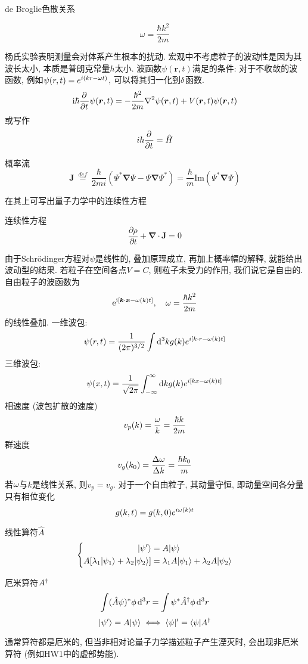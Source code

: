 \documentclass[UTF8]{ctexart}
\numberwithin{equation}{subsection}
\newcommand{\nts}[1]{
    \begin{center}
        \begin{notices}{}{}
            #1
        \end{notices}
    \end{center}
}
\begin{document}
de Broglie色散关系
\nts{
$$\omega ={\frac{\hbar k^{2}}{2m}}$$
}
杨氏实验表明测量会对体系产生根本的扰动. 
宏观中不考虑粒子的波动性是因为其波长太小, 本质是普朗克常量$h$太小. 
波函数$\psi(\bm{r},t)$满足的条件:
对于不收敛的波函数, 例如$\psi(r,t)=e^{i(kr-\omega t)}$, 可以将其归一化到$\delta$函数.
$$\mathrm{i}\hbar\frac{\partial^{} }{\partial t^{}}\psi(\bm{r},t)=-\frac{\hbar^2}{2m}\nabla^2\psi(\bm{r},t)+V(\bm{r},t)\psi(\bm{r},t)$$
或写作
$$i\hbar\frac{\partial^{} }{\partial t^{}}=\hat H$$
\begin{defi}{概率流}{}
$${\mathbf  {J}}\ {\stackrel  {def}{=}}\ {\frac  {\hbar }{2mi}}\left(\Psi ^{*}{\boldsymbol  {\nabla }}\Psi -\Psi {\boldsymbol  {\nabla }}\Psi ^{*}\right)={\frac  \hbar m}{\mbox{Im}}(\Psi ^{*}{\boldsymbol  {\nabla }}\Psi )$$
\end{defi}
在其上可写出量子力学中的连续性方程
\begin{thm}{连续性方程}{}
$${\frac  {\partial \rho }{\partial t}}+{\boldsymbol  {\nabla }}\cdot {\mathbf  {J}}=0$$
\end{thm}
由于Schrödinger方程对$\psi$是线性的, 叠加原理成立, 再加上概率幅的解释, 就能给出波动型的结果. 
若粒子在空间各点$V=C$, 则粒子未受力的作用, 我们说它是自由的. 自由粒子的波函数为
$$\mathrm{e}^{\mathrm{i}[\bm{k}\cdot \bm{x}-\omega(k) t]},\quad \omega=\frac{\hbar k^2}{2m}$$
的线性叠加.
一维波包:
$$\psi(r,t)=\frac{1}{(2\pi)^{3/2}}\int\mathop{}\!\mathrm{d}^3k g(k)e^{i[k\cdot r-\omega(k)t]}$$
三维波包:
$$\psi(x,t)=\frac{1}{\sqrt{2\pi}}\int_{-\infty}^\infty\mathop{}\!\mathrm{d} k g(k)e^{i[kx-\omega(k)t]}$$
相速度 (波包扩散的速度)
$$v_p(k)=\frac{\omega}{k}=\frac{\hbar k}{2m}$$
群速度
$$v_g(k_0)=\frac{\Delta \omega}{\Delta k}=\frac{\hbar k_0}{m}$$
若$\omega$与$k$是线性关系, 则$v_p=v_g$.
对于一个自由粒子, 其动量守恒, 即动量空间各分量只有相位变化
$$g(k,t)=g(k,0)e^{i\omega(k)t}$$
\begin{defi}{线性算符$\hat A$}{}
$$\left\{\begin{aligned} 
    | {\psi'} \rangle &= A| {\psi} \rangle\\
    A[\lambda_1| {\psi_1} \rangle+\lambda_2| {\psi_2} \rangle] &= \lambda_1A| {\psi_1} \rangle+\lambda_2A| {\psi_2} \rangle
 \end{aligned}\right.$$
\end{defi}
\begin{defi}{厄米算符$A^{\dagger}$}{}
$$\int (\hat A\psi)^*\phi \mathop{}\!\mathrm{d}^3r=\int \psi^*\hat A^{\dagger}\phi\mathop{}\!\mathrm{d}^3r$$
$$| {\psi'} \rangle=A| {\psi} \rangle\iff \langle {\psi} |'=\langle {\psi} |A^{\dagger}$$
\end{defi}
通常算符都是厄米的, 但当非相对论量子力学描述粒子产生湮灭时, 会出现非厄米算符 (例如HW1中的虚部势能).\\
\end{document}

